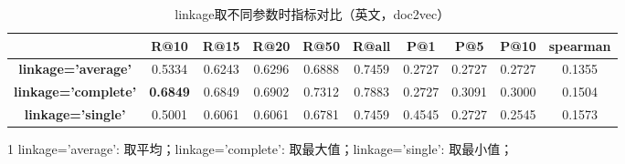 \documentclass[11pt]{article}
\begin{document}
\begin{CJK}{UTF8}{gkai}
\begin{table}[hp]\small
  \centering
    \begin{tabular}{c|ccccccccc}
      \hline
      \textcolor[rgb]{ 1,  0,  0}{} & \multicolumn{1}{c}{\textbf{R@10}} & \multicolumn{1}{c}{\textbf{R@15}} & \multicolumn{1}{c}{\textbf{R@20}} & \multicolumn{1}{c}{\textbf{R@50}} & \multicolumn{1}{c}{\textbf{R@all}} & \multicolumn{1}{c}{\textbf{P@1}} & \multicolumn{1}{c}{\textbf{P@5}} & \multicolumn{1}{c}{\textbf{P@10}} & \multicolumn{1}{c}{\textbf{spearman}} \\
      \hline
      \textbf{linkage='average'} & 0.5334  & 0.6243  & 0.6296  & 0.6888  & 0.7459  & 0.2727  & 0.2727  & 0.2727  & 0.1355  \\
      \hline
      \textbf{linkage='complete'} & \textcolor[rgb]{ 1,  0,  0}{\textbf{0.6849 }} & 0.6849  & 0.6902  & 0.7312  & 0.7883  & 0.2727  & 0.3091  & 0.3000  & 0.1504  \\
      \hline
      \textbf{linkage='single'} & 0.5001  & 0.6061  & 0.6061  & 0.6781  & 0.7459  & 0.4545  & 0.2727  & 0.2545  & 0.1573  \\
      \hline
    \end{tabular}%
    \begin{tablenotes}
      \item[1] linkage='average': 取平均；linkage='complete': 取最大值；linkage='single': 取最小值；
    \end{tablenotes}
    \caption{linkage取不同参数时指标对比（英文，doc2vec）}
  \label{tab:addlabel}%
\end{table}%


\end{CJK}
\end{document}
